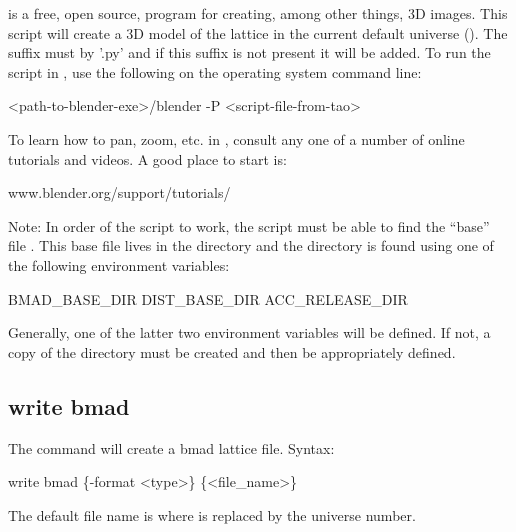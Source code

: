 {{{{{{{{{{{ is a free, open source, program for creating, among other things, 3D images. This
script will create a 3D model of the lattice in the current default universe ().
The suffix must by '.py' and if this suffix is not present it will be added. To run the script in
, use the following on the operating system command line:
\begin{example}
  <path-to-blender-exe>/blender -P <script-file-from-tao>
\end{example}
To learn how to pan, zoom, etc. in , consult any one of a number of online tutorials and
videos. A good place to start is:
\begin{example}
  www.blender.org/support/tutorials/  
\end{example}
Note: In order of the script to work, the script must be able to find the ``base'' file
. This base file lives in the  directory and the 
directory is found using one of the following environment variables:
\begin{example}
  BMAD_BASE_DIR
  DIST_BASE_DIR
  ACC_RELEASE_DIR
\end{example}
Generally, one of the latter two environment variables will be defined.  If not, a copy of the
\bmad directory must be created and then  be appropriately defined.


\subsection{write bmad}
\label{s:write.bmad}

The  command will create a bmad lattice file. Syntax:
\begin{example}
    write bmad \{-format <type>\} \{<file_name>\} 
\end{example}

The default file name is  where \vn{\#} is replaced by the universe number. 

}}}}}}}}}}}
